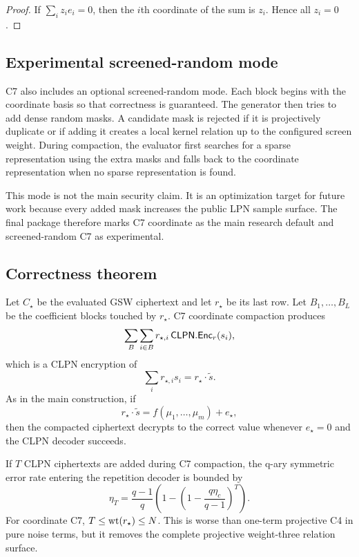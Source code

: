 \begin{proof}
If $\sum_i z_i e_i=0$, then the $i$th coordinate of the sum is $z_i$.  Hence
all $z_i=0$.
\end{proof}

\subsection{Experimental screened-random mode}

C7 also includes an optional screened-random mode.  Each block begins with the
coordinate basis so that correctness is guaranteed.  The generator then tries
to add dense random masks.  A candidate mask is rejected if it is projectively
duplicate or if adding it creates a local kernel relation up to the configured
screen weight.  During compaction, the evaluator first searches for a sparse
representation using the extra masks and falls back to the coordinate
representation when no sparse representation is found.

This mode is not the main security claim.  It is an optimization target for
future work because every added mask increases the public LPN sample surface.
The final package therefore marks C7 coordinate as the main research default
and screened-random C7 as experimental.

\subsection{Correctness theorem}

Let $C_\star$ be the evaluated GSW ciphertext and let $r_\star$ be its last
row.  Let $B_1,\ldots,B_L$ be the coefficient blocks touched by $r_\star$.
C7 coordinate compaction produces
\[
    \sum_{B}\sum_{i\in B} r_{\star,i}\,\mathsf{CLPN}.\mathsf{Enc}_r(s_i),
\]
which is a CLPN encryption of
\[
    \sum_i r_{\star,i}s_i = r_\star\cdot \widetilde{s}.
\]
As in the main construction, if
\[
    r_\star\cdot\widetilde{s}=f(\mu_1,\ldots,\mu_m)+e_\star,
\]
then the compacted ciphertext decrypts to the correct value whenever
$e_\star=0$ and the CLPN decoder succeeds.

If $T$ CLPN ciphertexts are added during C7 compaction, the q-ary symmetric
error rate entering the repetition decoder is bounded by
\[
    \eta_T
    =
    \frac{q-1}{q}
    \left(
    1-
    \left(1-\frac{q\eta_c}{q-1}\right)^T
    \right).
\]
For coordinate C7, $T\leq \operatorname{wt}(r_\star)\leq N$.  This is worse than one-term
projective C4 in pure noise terms, but it removes the complete projective
weight-three relation surface.

